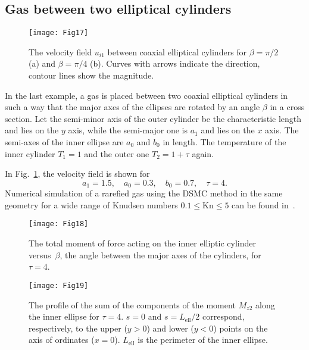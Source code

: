 \documentclass[smallextended, final]{svjour3} %
\newcommand{\Kn}{\mathrm{Kn}}
\begin{document}
\subsection{Gas between two elliptical cylinders}

\begin{figure}
    \centering
    \texttt{[image: Fig17]}
    \caption{The velocity field \(u_{i1}\) between coaxial elliptical cylinders
            for \(\beta = \pi/2\) (a) and \(\beta = \pi/4\) (b).
        Curves with arrows indicate the direction, contour lines show the magnitude.}
    \label{fig:elliptic}
\end{figure}

In the last example, a gas is placed between two coaxial elliptical cylinders
in such a way that the major axes of the ellipses are rotated by an angle \(\beta\) in a cross section.
Let the semi-minor axis of the outer cylinder be the characteristic length and lies on the \(y\) axis,
while the semi-major one is \(a_1\) and lies on the \(x\) axis.
The semi-axes of the inner ellipse are \(a_0\) and \(b_0\) in length.
The temperature of the inner cylinder \(T_1 = 1\) and the outer one \(T_2 = 1+\tau\) again.

In Fig.~\ref{fig:elliptic}, the velocity field is shown for
\[ a_1 = 1.5, \quad a_0 = 0.3, \quad b_0 = 0.7, \quad \tau = 4. \]
Numerical simulation of a rarefied gas using the DSMC method in the same geometry
for a wide range of Knudsen numbers \(0.1\le\Kn\le5\) can be found in~\cite{SoneCoaxial}.

\begin{figure}[ht]
    \centering
    \begin{minipage}{.48\textwidth}
        \centering
        \texttt{[image: Fig18]}
        \caption{The total moment of force acting on the inner elliptic cylinder
                versus~\(\beta\), the angle between the major axes of the cylinders,
                for \(\tau=4\).}
        \label{fig:elliptic:beta}
    \end{minipage}
    \quad
    \begin{minipage}{.48\textwidth}
        \centering
        \texttt{[image: Fig19]}
        \caption{The profile of the sum of the components of the moment \(M_{z2}\)
                along the inner ellipse for \(\tau=4\).
                \(s=0\) and \(s=L_\mathrm{ell}/2\) correspond, respectively,
                to the upper (\(y>0\)) and lower (\(y<0\)) points on the axis of ordinates (\(x=0\)).
                \(L_\mathrm{ell}\) is the perimeter of the inner ellipse.}
        \label{fig:elliptic:profiles}
    \end{minipage}
\end{figure}
\end{document}
